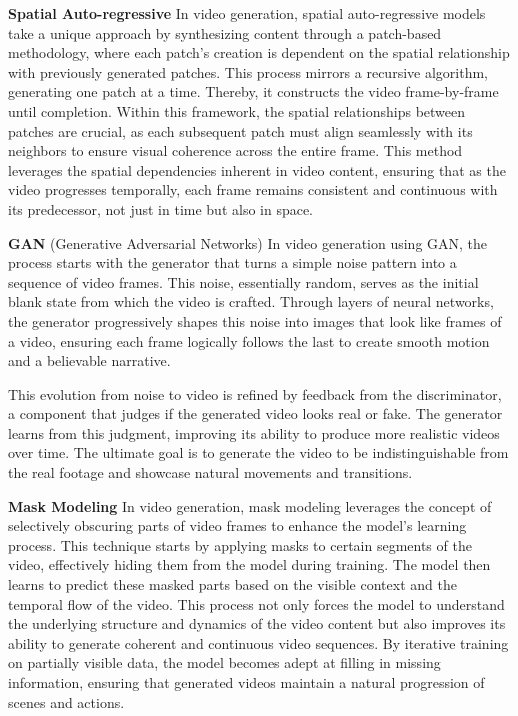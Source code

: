 \documentclass{article}
\begin{document}
\noindent\textbf{Spatial Auto-regressive} 
In video generation, spatial auto-regressive models\citep{auto} take a unique approach by synthesizing content through a patch-based methodology, where each patch's creation is dependent on the spatial relationship with previously generated patches. This process mirrors a recursive algorithm, generating one patch at a time. Thereby, it constructs the video frame-by-frame until completion. Within this framework, the spatial relationships between patches are crucial, as each subsequent patch must align seamlessly with its neighbors to ensure visual coherence across the entire frame. This method leverages the spatial dependencies inherent in video content, ensuring that as the video progresses temporally, each frame remains consistent and continuous with its predecessor, not just in time but also in space. 


\noindent\textbf{GAN} (Generative Adversarial Networks) \citep{GAN}
In video generation using GAN, the process starts with the generator that turns a simple noise pattern into a sequence of video frames. This noise, essentially random, serves as the initial blank state from which the video is crafted. Through layers of neural networks, the generator progressively shapes this noise into images that look like frames of a video, ensuring each frame logically follows the last to create smooth motion and a believable narrative.


This evolution from noise to video is refined by feedback from the discriminator, a component that judges if the generated video looks real or fake. The generator learns from this judgment, improving its ability to produce more realistic videos over time. The ultimate goal is to generate the video to be indistinguishable from the real footage and showcase natural movements and transitions.

\noindent\textbf{Mask Modeling}
In video generation, mask modeling leverages the concept of selectively obscuring parts of video frames to enhance the model's learning process. This technique starts by applying masks to certain segments of the video, effectively hiding them from the model during training. The model then learns to predict these masked parts based on the visible context and the temporal flow of the video. This process not only forces the model to understand the underlying structure and dynamics of the video content but also improves its ability to generate coherent and continuous video sequences. By iterative training on partially visible data, the model becomes adept at filling in missing information, ensuring that generated videos maintain a natural progression of scenes and actions.
\end{document}
